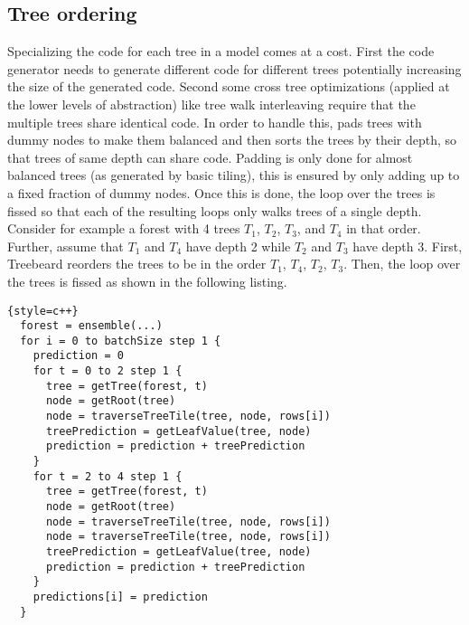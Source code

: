 \subsection{Tree ordering}
\label{sec:treeorder}
Specializing the code for each tree in a model comes at a cost. First the code generator needs to generate different code for different trees potentially increasing the size of the generated code. Second some cross tree optimizations (applied at the lower levels of abstraction) like tree walk interleaving require that the multiple trees share identical code. In order to handle
this, \Treebeard{} pads trees with dummy nodes to make them balanced and then sorts the trees by their depth, so that trees of same depth can share code. Padding is only done for almost balanced trees (as generated by basic tiling), this is ensured by only adding up to a fixed fraction of dummy nodes.  
 Once this is done, 
the loop over the trees is fissed so that each of the resulting loops only walks trees of a single depth. Consider for example a 
forest with 4 trees $T_1$, $T_2$, $T_3$, and $T_4$ in that order. Further, assume that $T_1$ and $T_4$ have depth 2 while $T_2$ and $T_3$
have depth 3. First, Treebeard reorders the trees to be in the order $T_1$, $T_4$, $T_2$, $T_3$. Then, the loop over the trees is fissed
as shown in the following listing.

\begin{lstlisting}{style=c++}
  forest = ensemble(...)
  for i = 0 to batchSize step 1 {
    prediction = 0
    for t = 0 to 2 step 1 {
      tree = getTree(forest, t) 
      node = getRoot(tree)
      node = traverseTreeTile(tree, node, rows[i])
      treePrediction = getLeafValue(tree, node)
      prediction = prediction + treePrediction
    }
    for t = 2 to 4 step 1 {
      tree = getTree(forest, t) 
      node = getRoot(tree)
      node = traverseTreeTile(tree, node, rows[i])
      node = traverseTreeTile(tree, node, rows[i])
      treePrediction = getLeafValue(tree, node)
      prediction = prediction + treePrediction
    }
    predictions[i] = prediction
  }  
\end{lstlisting}

